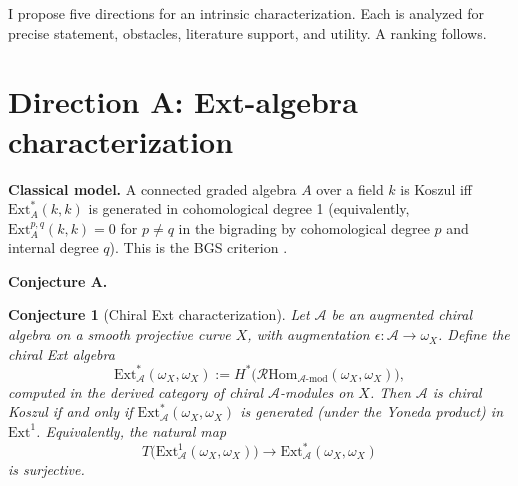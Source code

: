 \documentclass[11pt]{article}
\newtheorem{conjecture}{Conjecture}
\theoremstyle{remark}
\newcommand{\cA}{\mathcal{A}}
\newcommand{\Ext}{\mathrm{Ext}}
\newcommand{\Hom}{\mathrm{Hom}}
\begin{document}
I propose five directions for an intrinsic characterization.  Each is analyzed for precise statement, obstacles, literature support, and utility.  A ranking follows.

\section{Direction A: Ext-algebra characterization}

\textbf{Classical model.}  A connected graded algebra $A$ over a field $k$ is Koszul iff $\Ext^*_A(k,k)$ is generated in cohomological degree 1 (equivalently, $\Ext^{p,q}_A(k,k) = 0$ for $p \neq q$ in the bigrading by cohomological degree $p$ and internal degree $q$).  This is the BGS criterion \cite{BGS96}.

\textbf{Conjecture A.}
\begin{conjecture}[Chiral Ext characterization]\label{conj:ext}
Let $\cA$ be an augmented chiral algebra on a smooth projective curve $X$, with augmentation $\epsilon\colon \cA \to \omega_X$.  Define the chiral Ext algebra
\[
\Ext^*_\cA(\omega_X, \omega_X) := H^*\bigl(\mathcal{R}\!\Hom_{\cA\text{-mod}}(\omega_X, \omega_X)\bigr),
\]
computed in the derived category of chiral $\cA$-modules on $X$.  Then $\cA$ is chiral Koszul if and only if $\Ext^*_\cA(\omega_X, \omega_X)$ is generated (under the Yoneda product) in $\Ext^1$.  Equivalently, the natural map
\[
T\bigl(\Ext^1_\cA(\omega_X, \omega_X)\bigr) \longrightarrow \Ext^*_\cA(\omega_X, \omega_X)
\]
is surjective.
\end{conjecture}
\end{document}
